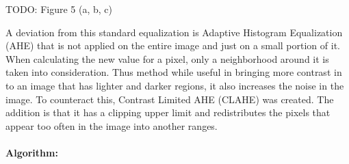 TODO: Figure 5 (a, b, c)

A deviation from this standard equalization is Adaptive Histogram Equalization (AHE) that is not applied on the entire image and just on a small portion of it. When calculating the new value for a pixel, only a neighborhood around it is taken into consideration. Thus method while useful in bringing more contrast in to an image that has lighter and darker regions, it also increases the noise in the image. To counteract this, Contrast Limited AHE (CLAHE) was created. The addition is that it has a clipping upper limit and redistributes the pixels that appear too often in the image into another ranges.

\paragraph*{Algorithm:}\mbox{}\par

